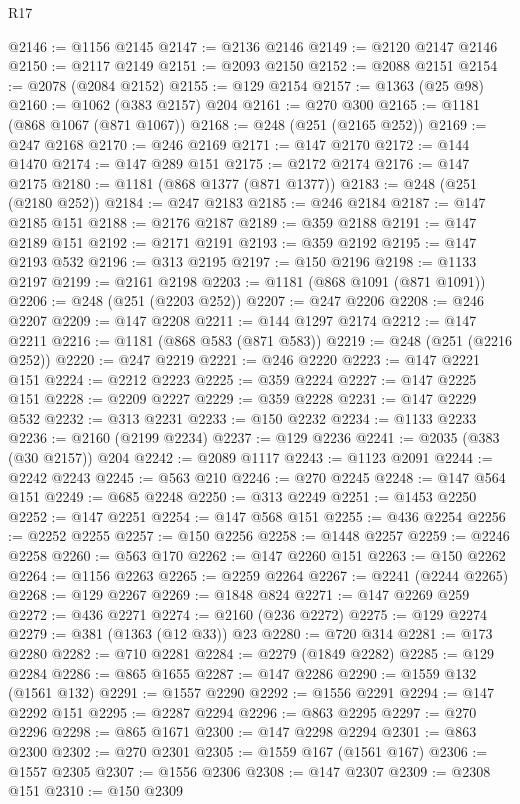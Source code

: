 \begin{lexlean}{R17}
\begin{coremodule}
@2146 := @1156 @2145
@2147 := @2136 @2146
@2149 := @2120 @2147 @2146
@2150 := @2117 @2149
@2151 := @2093 @2150
@2152 := @2088 @2151
@2154 := @2078 (@2084 @2152)
@2155 := @129 @2154
@2157 := @1363 (@25 @98)
@2160 := @1062 (@383 @2157) @204
@2161 := @270 @300
@2165 := @1181 (@868 @1067 (@871 @1067))
@2168 := @248 (@251 (@2165 @252))
@2169 := @247 @2168
@2170 := @246 @2169
@2171 := @147 @2170
@2172 := @144 @1470
@2174 := @147 @289 @151
@2175 := @2172 @2174
@2176 := @147 @2175
@2180 := @1181 (@868 @1377 (@871 @1377))
@2183 := @248 (@251 (@2180 @252))
@2184 := @247 @2183
@2185 := @246 @2184
@2187 := @147 @2185 @151
@2188 := @2176 @2187
@2189 := @359 @2188
@2191 := @147 @2189 @151
@2192 := @2171 @2191
@2193 := @359 @2192
@2195 := @147 @2193 @532
@2196 := @313 @2195
@2197 := @150 @2196
@2198 := @1133 @2197
@2199 := @2161 @2198
@2203 := @1181 (@868 @1091 (@871 @1091))
@2206 := @248 (@251 (@2203 @252))
@2207 := @247 @2206
@2208 := @246 @2207
@2209 := @147 @2208
@2211 := @144 @1297 @2174
@2212 := @147 @2211
@2216 := @1181 (@868 @583 (@871 @583))
@2219 := @248 (@251 (@2216 @252))
@2220 := @247 @2219
@2221 := @246 @2220
@2223 := @147 @2221 @151
@2224 := @2212 @2223
@2225 := @359 @2224
@2227 := @147 @2225 @151
@2228 := @2209 @2227
@2229 := @359 @2228
@2231 := @147 @2229 @532
@2232 := @313 @2231
@2233 := @150 @2232
@2234 := @1133 @2233
@2236 := @2160 (@2199 @2234)
@2237 := @129 @2236
@2241 := @2035 (@383 (@30 @2157)) @204
@2242 := @2089 @1117
@2243 := @1123 @2091
@2244 := @2242 @2243
@2245 := @563 @210
@2246 := @270 @2245
@2248 := @147 @564 @151
@2249 := @685 @2248
@2250 := @313 @2249
@2251 := @1453 @2250
@2252 := @147 @2251
@2254 := @147 @568 @151
@2255 := @436 @2254
@2256 := @2252 @2255
@2257 := @150 @2256
@2258 := @1448 @2257
@2259 := @2246 @2258
@2260 := @563 @170
@2262 := @147 @2260 @151
@2263 := @150 @2262
@2264 := @1156 @2263
@2265 := @2259 @2264
@2267 := @2241 (@2244 @2265)
@2268 := @129 @2267
@2269 := @1848 @824
@2271 := @147 @2269 @259
@2272 := @436 @2271
@2274 := @2160 (@236 @2272)
@2275 := @129 @2274
@2279 := @381 (@1363 (@12 @33)) @23
@2280 := @720 @314
@2281 := @173 @2280
@2282 := @710 @2281
@2284 := @2279 (@1849 @2282)
@2285 := @129 @2284
@2286 := @865 @1655
@2287 := @147 @2286
@2290 := @1559 @132 (@1561 @132)
@2291 := @1557 @2290
@2292 := @1556 @2291
@2294 := @147 @2292 @151
@2295 := @2287 @2294
@2296 := @863 @2295
@2297 := @270 @2296
@2298 := @865 @1671
@2300 := @147 @2298 @2294
@2301 := @863 @2300
@2302 := @270 @2301
@2305 := @1559 @167 (@1561 @167)
@2306 := @1557 @2305
@2307 := @1556 @2306
@2308 := @147 @2307
@2309 := @2308 @151
@2310 := @150 @2309

\end{coremodule}
\end{lexlean}
